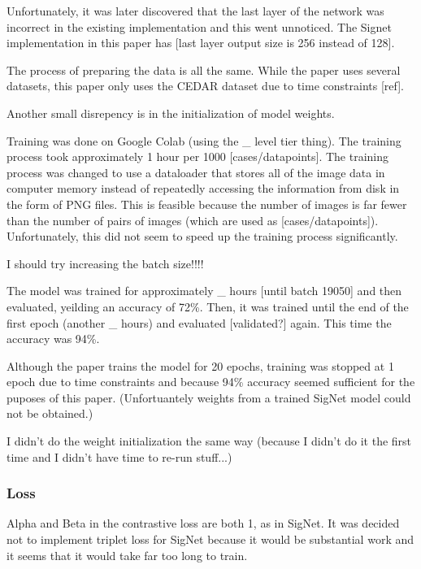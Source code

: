 Unfortunately, it was later discovered that the last layer of the network was incorrect in the existing implementation and this went unnoticed.
The Signet implementation in this paper has [last layer output size is 256 instead of 128].

The process of preparing the data is all the same.
While the paper uses several datasets, this paper only uses the CEDAR dataset due to time constraints [ref].

Another small disrepency is in the initialization of model weights.

Training was done on Google Colab (using the \_ level tier thing).
The training process took approximately 1 hour per 1000 [cases/datapoints].
The training process was changed to use a dataloader that stores all of the image data in computer memory instead of repeatedly accessing the information from disk in the form of PNG files.
This is feasible because the number of images is far fewer than the number of pairs of images (which are used as [cases/datapoints]).
Unfortunately, this did not seem to speed up the training process significantly.

I should try increasing the batch size!!!!

The model was trained for approximately \_ hours [until batch 19050] and then evaluated, yeilding an accuracy of 72\%.
Then, it was trained until the end of the first epoch (another \_ hours) and evaluated [validated?] again.
This time the accuracy was 94\%.

Although the paper trains the model for 20 epochs, training was stopped at 1 epoch due to time constraints and because 94\% accuracy seemed sufficient for the puposes of this paper.
(Unfortuantely weights from a trained SigNet model could not be obtained.)

I didn't do the weight initialization the same way (because I didn't do it the first time and I didn't have time to re-run stuff...)

\subsubsection{Loss}
Alpha and Beta in the contrastive loss are both 1, as in SigNet\cite{GitHub_sounakdey}.
It was decided not to implement triplet loss for SigNet because it would be substantial work and it seems that it would take far too long to train.


